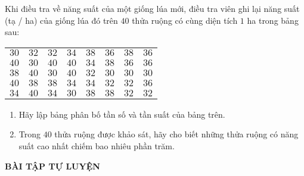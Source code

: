 \begin{vd}
Khi điều tra về năng suất của một giống lúa mới, điều tra viên ghi lại năng suất (tạ / ha) của giống lúa đó trên $40$ thửa ruộng có cùng diện tích $1$ ha trong bảng sau:
\begin{center}
	\begin{tabular}{|llllllll|}
\hline 
$30$ & $32$ & $32$ & $34$ & $38$ & $36$ & $38$ & $36$ \\ 
$40$ & $30$ & $40$ & $40$ & $34$ & $38$ & $36$ & $36$ \\ 
$38$ & $40$ & $30$ & $40$ & $32$ & $30$ & $30$ & $30$ \\ 
$40$ & $38$ & $38$ & $34$ & $34$ & $32$ & $32$ & $36$ \\ 
$34$ & $40$ & $34$ & $30$ & $38$ & $38$ & $32$ & $32$ \\ 
\hline 
\end{tabular}
\end{center}
\begin{enumerate}
\item Hãy lập bảng phân bố tần số và tần suất của bảng trên.
\item Trong $40$ thửa ruộng được khảo sát, hãy cho biết những thửa ruộng có năng suất cao nhất chiếm bao nhiêu phần trăm.
\end{enumerate}
\end{vd}

\begin{center}
\textbf{BÀI TẬP TỰ LUYỆN}
\end{center}

